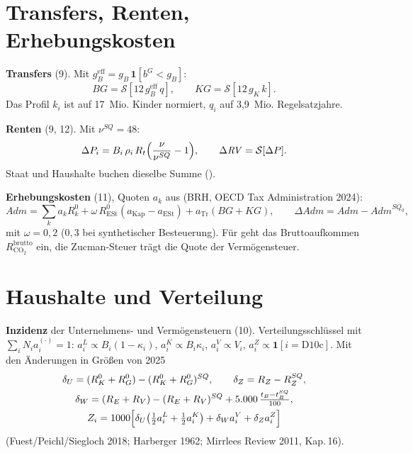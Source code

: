 \section{Transfers, Renten, Erhebungskosten}

\textbf{Transfers} (9). Mit $g_B^{\text{eff}}=g_B\,\mathbf 1[b^G<g_B]$:
\begin{equation}
BG=\mathcal S[12\,g^{\text{eff}}_B\,q],\qquad KG=\mathcal S[12\,g_K\,k].
\end{equation}
Das Profil $k_i$ ist auf 17~Mio. Kinder normiert, $q_i$ auf 3,9~Mio. Regelsatzjahre.

\textbf{Renten} (9, 12). Mit $\nu^{SQ}=48$:
\begin{equation}
\Delta P_i=B_i\,\rho_i\,R_t\Bigl(\frac{\nu}{\nu^{SQ}}-1\Bigr),\qquad \Delta\mathit{RV}=\mathcal S[\Delta P].
\end{equation}
Staat und Haushalte buchen dieselbe Summe ().

\textbf{Erhebungskosten} (11), Quoten $a_k$ aus  (BRH, OECD Tax
Administration 2024):
\begin{equation}
\mathit{Adm}=\sum_k a_k R^0_k + \omega\,R^0_{\text{ESt}}(a_{\text{Kap}}-a_{\text{ESt}})
 + a_{\text{Tr}}(BG+KG),\qquad \Delta\mathit{Adm}=\mathit{Adm}-\mathit{Adm}^{SQ_0},
\end{equation}
mit $\omega=0{,}2$ ($0{,}3$ bei synthetischer Besteuerung). Für \COz{} geht das
Bruttoaufkommen $R^{\text{brutto}}_{\text{CO}_2}$ ein, die Zucman-Steuer trägt die Quote der
Vermögensteuer.

\section{Haushalte und Verteilung}
\label{sec:haushalte}

\textbf{Inzidenz} der Unternehmens- und Vermögensteuern (10). Verteilungsschlüssel mit
$\sum_iN_ia^{(\cdot)}_i=1$: $a^L_i\propto B_i(1-\kappa_i)$, $a^K_i\propto B_i\kappa_i$,
$a^V_i\propto V_i$, $a^Z_i\propto\mathbf 1[i=\text{D10c}]$. Mit den Änderungen in Größen von
2025
\begin{gather}
\delta_U=(R^0_K+R^0_G)-(R^0_K+R^0_G)^{SQ},\qquad \delta_Z=R_Z-R_Z^{SQ},\\
\delta_W=(R_E+R_V)-(R_E+R_V)^{SQ}+5.000\,\tfrac{t_B-t_B^{SQ}}{100},\\
Z_i=1000\Bigl[\delta_U\bigl(\tfrac12a^L_i+\tfrac12a^K_i\bigr)+\delta_Wa^V_i+\delta_Za^Z_i\Bigr]
\end{gather}
(Fuest/Peichl/Siegloch 2018; Harberger 1962; Mirrlees Review 2011, Kap.\,16).

